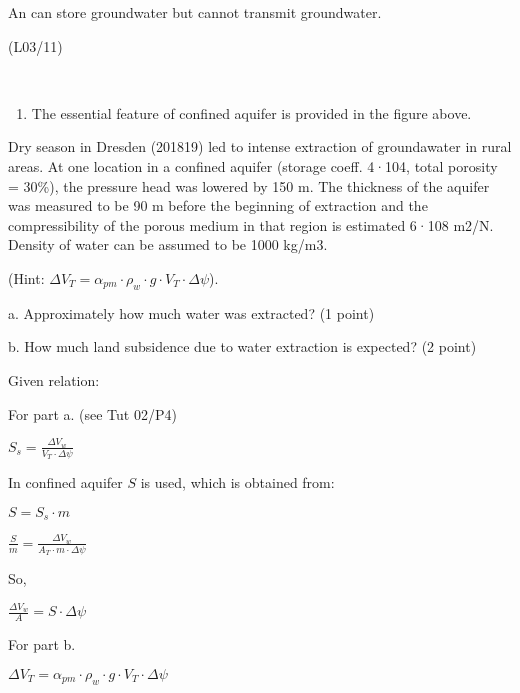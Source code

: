 \documentclass[letterpaper,10pt,english]{sphinxmanual}
\let\sphinxpxdimen\pdfpxdimen\else\newdimen\sphinxpxdimen
\begin{document}
An  can store groundwater but cannot transmit groundwater.

 \sphinxhyphen{} (L03/11)

 

\noindent\sphinxincludegraphics[width=1000\sphinxpxdimen]{{Q1b_2019-20}.png}

\begin{enumerate}
%
\item {} 
The essential feature of confined aquifer is provided in the figure above.

\end{enumerate}


Dry season in Dresden (2018\sphinxhyphen{}19) led to intense extraction of groundawater in rural areas. At one location in a confined aquifer (storage coeff. 4·10\sphinxhyphen{}4, total porosity = 30\%),  the pressure head was lowered by 150 m. The thickness of the aquifer was measured to be 90 m before the beginning of extraction and the compressibility of the porous medium in that region is estimated 6·10\sphinxhyphen{}8 m2/N. Density of water can be assumed to be 1000 kg/m3.

(Hint: \(\Delta V_T = \alpha_{pm}\cdot\rho_w \cdot g \cdot  V_T \cdot  \Delta \psi \)).

a. Approximately how much water was extracted? (1 point)

b. How much land subsidence due to water extraction is expected? (2 point)


Given relation:

For part a. (see Tut 02/P4)

\(
S_s  = \frac{\Delta V_w}{V_T\cdot \Delta \psi}
\)

In confined aquifer \(S\) is used, which is obtained from:

\(S = S_s \cdot m\)

\(
 \frac{S}{m} = \frac{\Delta V_w}{A_T\cdot m \cdot \Delta \psi}
\)

So,

\(  \frac{\Delta V_w}{A}  = S \cdot \Delta \psi\)

For part b.

\(\Delta V_T = \alpha_{pm}\cdot\rho_w \cdot g \cdot  V_T \cdot  \Delta \psi \)
\end{document}
